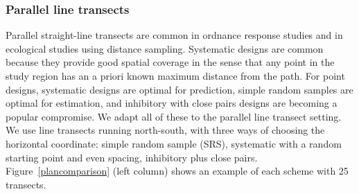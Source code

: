 \documentclass[review]{elsarticle}
\begin{document}
\subsubsection{Parallel line transects}

Parallel straight-line transects are common in ordnance response studies and in
ecological studies using distance sampling. Systematic designs are common
because they provide good spatial coverage in the sense that any point in the
study region has an a priori known maximum distance from the path. For point
designs, systematic designs are optimal for prediction, simple random samples
are optimal for estimation, and inhibitory with close pairs designs are
becoming a popular compromise. We adapt all of these to the parallel line
transect setting. We use line transects running north-south, with three ways of
choosing the horizontal coordinate: simple random sample (SRS), systematic with
a random starting point and even spacing, inhibitory plus close pairs.
Figure~\ref{plancomparison} (left column) shows an example of each scheme with
25 transects.

\end{document}
